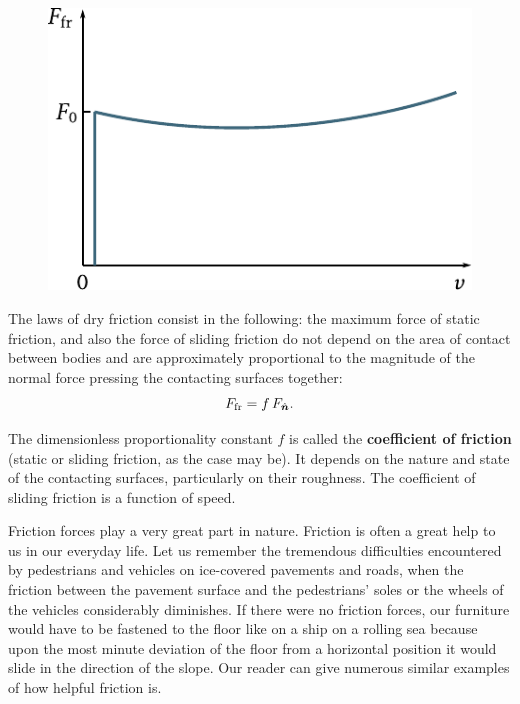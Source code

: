 \begin{figure}[t]
	\begin{center}
		\includegraphics[scale=0.98]{figures/ch_02/fig_2_9.pdf}
		\caption[]{}
		\label{fig:2_9}
	\end{center}
	\vspace{-0.7cm}
\end{figure}

The laws of dry friction consist in the following: the maximum force of static friction, and also the force of sliding friction do not depend on the area of contact between bodies and are approximately proportional to the magnitude of the normal force pressing the contacting surfaces together:
\begin{equation}\label{eq:2_35}
F_{\text{fr}} = f\,F_{\hat{\boldsymbol{n}}}.
\end{equation}

\noindent
The dimensionless proportionality constant $f$ is called the \textbf{coefficient of friction} (static or sliding friction, as the case may be). It depends on the nature and state of the contacting surfaces, particularly on their roughness. The coefficient of sliding friction is a function of speed.

Friction forces play a very great part in nature. Friction is often a great help to us in our everyday life. Let us remember the tremendous difficulties encountered by pedestrians and vehicles on ice-covered pavements and roads, when the friction between the pavement surface and the pedestrians' soles or the wheels of the vehicles considerably diminishes. If there were no friction forces, our furniture would have to be fastened to the floor like on a ship on a rolling sea because upon the most minute deviation of the floor from a horizontal position it would slide in the direction of the slope. Our reader can give numerous similar examples of how helpful friction is.

